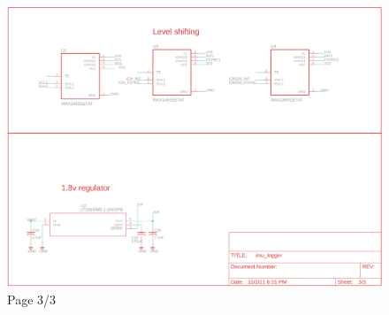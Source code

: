 \documentclass{article}
\begin{document}
\begin{figure}[H]
	\centering
	\includegraphics[width=\textwidth]{images/imu_logger_schem_3}
	\caption{Page 3/3}
	\label{fig:schematic-imu-p3}
\end{figure}
\end{document}
